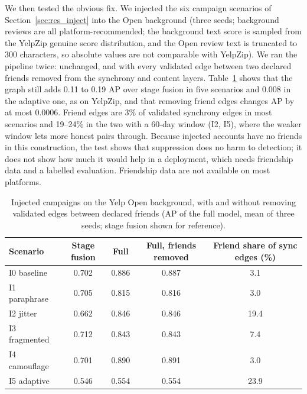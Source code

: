 \documentclass[pdflatex,sn-basic]{sn-jnl}
\theoremstyle{thmstyleone}
\theoremstyle{thmstylethree}
\begin{document}
We then tested the obvious fix. We injected the six campaign scenarios of Section~\ref{sec:res_inject} into the Open background (three seeds; background reviews are all platform-recommended; the background text score is sampled from the YelpZip genuine score distribution, and the Open review text is truncated to 300 characters, so absolute values are not comparable with YelpZip). We ran the pipeline twice: unchanged, and with every validated edge between two declared friends removed from the synchrony and content layers. Table~\ref{tab:open_inj} shows that the graph still adds 0.11 to 0.19 AP over stage fusion in five scenarios and 0.008 in the adaptive one, as on YelpZip, and that removing friend edges changes AP by at most 0.0006. Friend edges are 3\% of validated synchrony edges in most scenarios and 19--24\% in the two with a 60-day window (I2, I5), where the weaker window lets more honest pairs through. Because injected accounts have no friends in this construction, the test shows that suppression does no harm to detection; it does not show how much it would help in a deployment, which needs friendship data and a labelled evaluation. Friendship data are not available on most platforms.

\begin{table}[t]
\caption{Injected campaigns on the Yelp Open background, with and without removing validated edges between declared friends (AP of the full model, mean of three seeds; stage fusion shown for reference).}\label{tab:open_inj}
\footnotesize
\begin{tabular}{@{}lcccc@{}}
\toprule
Scenario & Stage fusion & Full & Full, friends removed & Friend share of sync edges (\%) \\
\midrule
I0 baseline & 0.702 & 0.886 & 0.887 & 3.1 \\
I1 paraphrase & 0.705 & 0.815 & 0.816 & 3.0 \\
I2 jitter & 0.662 & 0.846 & 0.846 & 19.4 \\
I3 fragmented & 0.712 & 0.843 & 0.843 & 7.4 \\
I4 camouflage & 0.701 & 0.890 & 0.891 & 3.0 \\
I5 adaptive & 0.546 & 0.554 & 0.554 & 23.9 \\
\bottomrule
\end{tabular}
\end{table}
\end{document}
